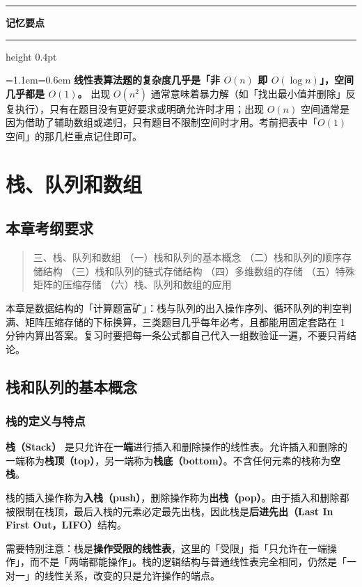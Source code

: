 \documentclass[11pt,openany,UTF8]{ctexbook}
\newcommand{\callouthead}[2]{%
  \par\addvspace{7pt}\noindent
  {\color{#1}\rule[-0.15em]{3pt}{1.05em}}\hspace{0.5em}%
  {\bfseries\color{#1}#2}\par\nobreak\vspace{-0.35em}%
  {\color{rulesep}\hrule height 0.4pt}\nobreak\vspace{0.45em}%
  \begingroup\small\setlength{\parindent}{0pt}%
  \leftskip=1.1em\rightskip=0.6em\noindent\ignorespaces}
\newcommand{\calloutend}{\par\endgroup\addvspace{7pt}}
\newenvironment{callkey}[1]{\callouthead{keybar}{#1}}{\calloutend}
\begin{document}
\begin{callkey}{记忆要点}
\textbf{线性表算法题的复杂度几乎是「非 $O(n)$ 即 $O(\log n)$」，空间几乎都是 $O(1)$。} 出现 $O(n^2)$ 通常意味着暴力解（如「找出最小值并删除」反复执行），只有在题目没有更好要求或明确允许时才用；出现 $O(n)$ 空间通常是因为借助了辅助数组或递归，只有题目不限制空间时才用。考前把表中「$O(1)$ 空间」的那几栏重点记住即可。

\end{callkey}

\chapter{栈、队列和数组}
\section*{本章考纲要求}

\begin{quote}
三、栈、队列和数组 （一）栈和队列的基本概念 （二）栈和队列的顺序存储结构 （三）栈和队列的链式存储结构 （四）多维数组的存储 （五）特殊矩阵的压缩存储 （六）栈、队列和数组的应用

\end{quote}
本章是数据结构的「计算题富矿」：栈与队列的出入操作序列、循环队列的判空判满、矩阵压缩存储的下标换算，三类题目几乎每年必考，且都能用固定套路在 1 分钟内算出答案。复习时要把每一条公式都自己代入一组数验证一遍，不要只背结论。

\section{栈和队列的基本概念}

\subsection{栈的定义与特点}

\textbf{栈（Stack）} 是只允许在\textbf{一端}进行插入和删除操作的线性表。允许插入和删除的一端称为\textbf{栈顶（top）}，另一端称为\textbf{栈底（bottom）}。不含任何元素的栈称为\textbf{空栈}。

栈的插入操作称为\textbf{入栈（push）}，删除操作称为\textbf{出栈（pop）}。由于插入和删除都被限制在栈顶，最后入栈的元素必定最先出栈，因此栈是\textbf{后进先出（Last In First Out，LIFO）}结构。

需要特别注意：栈是\textbf{操作受限的线性表}，这里的「受限」指「只允许在一端操作」，而不是「两端都能操作」。栈的逻辑结构与普通线性表完全相同，仍然是「一对一」的线性关系，改变的只是允许操作的端点。
\end{document}
